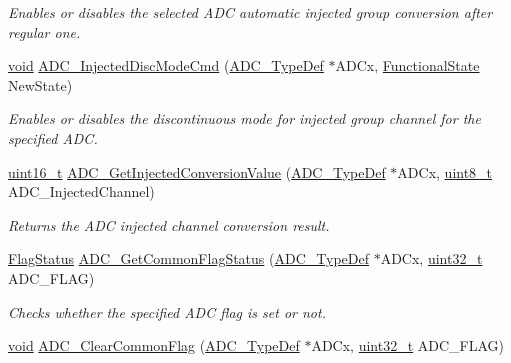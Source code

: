 \begin{DoxyCompactItemize}
\begin{DoxyCompactList}\small\item\em Enables or disables the selected A\-D\-C automatic injected group conversion after regular one. \end{DoxyCompactList}\item 
\hyperlink{group___n_a_m_e_ga18028b8badbf1ea7e704ccac3c488e82}{void} \hyperlink{group___a_d_c___exported___constants_ga0b583b94183fa4ff287177b9ee808092}{A\-D\-C\-\_\-\-Injected\-Disc\-Mode\-Cmd} (\hyperlink{struct_a_d_c___type_def}{A\-D\-C\-\_\-\-Type\-Def} $\ast$A\-D\-Cx, \hyperlink{group___exported__types_gac9a7e9a35d2513ec15c3b537aaa4fba1}{Functional\-State} New\-State)
\begin{DoxyCompactList}\small\item\em Enables or disables the discontinuous mode for injected group channel for the specified A\-D\-C. \end{DoxyCompactList}\item 
\hyperlink{stdint_8h_a273cf69d639a59973b6019625df33e30}{uint16\-\_\-t} \hyperlink{group___a_d_c___exported___constants_ga1dea5ed24571a2e0ce4cbd41c9c1ec46}{A\-D\-C\-\_\-\-Get\-Injected\-Conversion\-Value} (\hyperlink{struct_a_d_c___type_def}{A\-D\-C\-\_\-\-Type\-Def} $\ast$A\-D\-Cx, \hyperlink{stdint_8h_aba7bc1797add20fe3efdf37ced1182c5}{uint8\-\_\-t} A\-D\-C\-\_\-\-Injected\-Channel)
\begin{DoxyCompactList}\small\item\em Returns the A\-D\-C injected channel conversion result. \end{DoxyCompactList}\item 
\hyperlink{group___exported__types_ga89136caac2e14c55151f527ac02daaff}{Flag\-Status} \hyperlink{group___a_d_c___exported___constants_ga46c2d933d5f929f2c3be2a3c6db8d9e6}{A\-D\-C\-\_\-\-Get\-Common\-Flag\-Status} (\hyperlink{struct_a_d_c___type_def}{A\-D\-C\-\_\-\-Type\-Def} $\ast$A\-D\-Cx, \hyperlink{stdint_8h_a435d1572bf3f880d55459d9805097f62}{uint32\-\_\-t} A\-D\-C\-\_\-\-F\-L\-A\-G)
\begin{DoxyCompactList}\small\item\em Checks whether the specified A\-D\-C flag is set or not. \end{DoxyCompactList}\item 
\hyperlink{group___n_a_m_e_ga18028b8badbf1ea7e704ccac3c488e82}{void} \hyperlink{group___a_d_c___exported___constants_gadced9dbc264209e4c69aff275a9d6049}{A\-D\-C\-\_\-\-Clear\-Common\-Flag} (\hyperlink{struct_a_d_c___type_def}{A\-D\-C\-\_\-\-Type\-Def} $\ast$A\-D\-Cx, \hyperlink{stdint_8h_a435d1572bf3f880d55459d9805097f62}{uint32\-\_\-t} A\-D\-C\-\_\-\-F\-L\-A\-G)

\end{DoxyCompactItemize}
